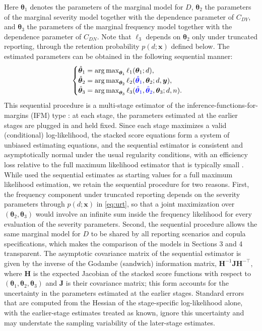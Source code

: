 \documentclass[11pt]{article}
\newcommand{\rev}[1]{{\color{blue}#1}}
\DeclareMathOperator*{\argmax}{arg\,max}
\begin{document}
\rev{Here $\boldsymbol{\theta}_1$ denotes the parameters of the marginal model for $D$, $\boldsymbol{\theta}_2$ the parameters of the marginal severity model together with the dependence parameter of $C_{DY}$, and $\boldsymbol{\theta}_3$ the parameters of the marginal frequency model together with the dependence parameter of $C_{DN}$. Note that $\ell_3$ depends on $\boldsymbol{\theta}_2$ only under truncated reporting, through the retention probability $p(d;\bm{x})$ defined below.}
The estimated parameters can be obtained in the following sequential manner:
$$
\begin{cases}
\hat{\bm{\theta}}_1 = \argmax_{\boldsymbol{\theta}_1} \ell_1(\boldsymbol{\theta}_1;d)	, \\
\hat{\bm{\theta}}_2 = \argmax_{\boldsymbol{\theta}_2}  \ell_2(\rev{\hat{\boldsymbol{\theta}}_1}, \boldsymbol{\theta}_2;d, \boldsymbol{y}) 	, \\
\hat{\bm{\theta}}_3 = \argmax_{\boldsymbol{\theta}_3} \ell_3(\rev{\hat{\boldsymbol{\theta}}_1}, \rev{\hat{\boldsymbol{\theta}}_2}, \boldsymbol{\theta}_3;d, n)	.
\end{cases}
$$
\rev{This sequential procedure is a multi-stage estimator of the inference-functions-for-margins (IFM) type \citep{joe1996estimation, zhao2005composite}: at each stage, the parameters estimated at the earlier stages are plugged in and held fixed. Since each stage maximizes a valid (conditional) log-likelihood, the stacked score equations form a system of unbiased estimating equations, and the sequential estimator is consistent and asymptotically normal under the usual regularity conditions, with an efficiency loss relative to the full maximum likelihood estimator that is typically small \citep{zhao2005composite}. While \citet{shi2022copula} used the sequential estimates as starting values for a full maximum likelihood estimation, we retain the sequential procedure for two reasons. First, the frequency component under truncated reporting depends on the severity parameters through $p(d;\bm{x})$ in \eqref{eq:urt}, so that a joint maximization over $(\boldsymbol{\theta}_2,\boldsymbol{\theta}_3)$ would involve an infinite sum inside the frequency likelihood for every evaluation of the severity parameters. Second, the sequential procedure allows the same marginal model for $D$ to be shared by all reporting scenarios and copula specifications, which makes the comparison of the models in Sections 3 and 4 transparent. The asymptotic covariance matrix of the sequential estimator is given by the inverse of the Godambe (sandwich) information matrix, $\bm{H}^{-1}\bm{J}\bm{H}^{-\top}$, where $\bm{H}$ is the expected Jacobian of the stacked score functions with respect to $(\boldsymbol{\theta}_1,\boldsymbol{\theta}_2,\boldsymbol{\theta}_3)$ and $\bm{J}$ is their covariance matrix; this form accounts for the uncertainty in the parameters estimated at the earlier stages. Standard errors that are computed from the Hessian of the stage-specific log-likelihood alone, with the earlier-stage estimates treated as known, ignore this uncertainty and may understate the sampling variability of the later-stage estimates.}
\end{document}
